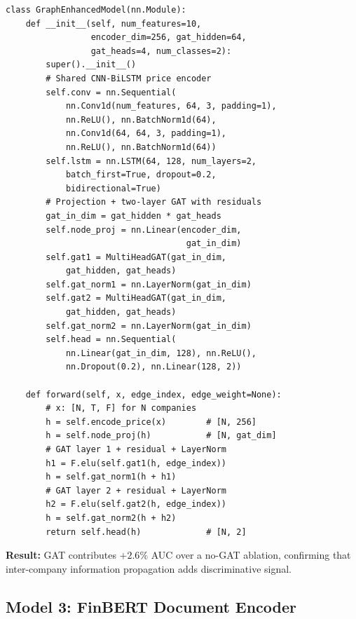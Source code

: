 \begin{lstlisting}[caption={Graph-enhanced model with residual GAT (src/models/gat\_model.py)}]
class GraphEnhancedModel(nn.Module):
    def __init__(self, num_features=10,
                 encoder_dim=256, gat_hidden=64,
                 gat_heads=4, num_classes=2):
        super().__init__()
        # Shared CNN-BiLSTM price encoder
        self.conv = nn.Sequential(
            nn.Conv1d(num_features, 64, 3, padding=1),
            nn.ReLU(), nn.BatchNorm1d(64),
            nn.Conv1d(64, 64, 3, padding=1),
            nn.ReLU(), nn.BatchNorm1d(64))
        self.lstm = nn.LSTM(64, 128, num_layers=2,
            batch_first=True, dropout=0.2,
            bidirectional=True)
        # Projection + two-layer GAT with residuals
        gat_in_dim = gat_hidden * gat_heads
        self.node_proj = nn.Linear(encoder_dim,
                                    gat_in_dim)
        self.gat1 = MultiHeadGAT(gat_in_dim,
            gat_hidden, gat_heads)
        self.gat_norm1 = nn.LayerNorm(gat_in_dim)
        self.gat2 = MultiHeadGAT(gat_in_dim,
            gat_hidden, gat_heads)
        self.gat_norm2 = nn.LayerNorm(gat_in_dim)
        self.head = nn.Sequential(
            nn.Linear(gat_in_dim, 128), nn.ReLU(),
            nn.Dropout(0.2), nn.Linear(128, 2))

    def forward(self, x, edge_index, edge_weight=None):
        # x: [N, T, F] for N companies
        h = self.encode_price(x)        # [N, 256]
        h = self.node_proj(h)           # [N, gat_dim]
        # GAT layer 1 + residual + LayerNorm
        h1 = F.elu(self.gat1(h, edge_index))
        h = self.gat_norm1(h + h1)
        # GAT layer 2 + residual + LayerNorm
        h2 = F.elu(self.gat2(h, edge_index))
        h = self.gat_norm2(h + h2)
        return self.head(h)             # [N, 2]
\end{lstlisting}

\textbf{Result:} GAT contributes $+2.6\%$ AUC over a no-GAT ablation, confirming that inter-company information propagation adds discriminative signal.

\subsection{Model 3: FinBERT Document Encoder}

